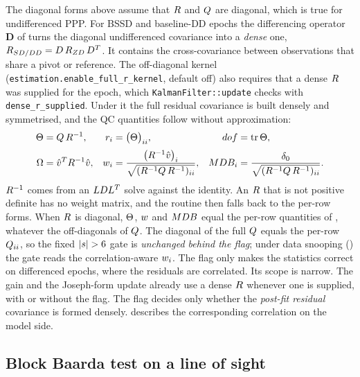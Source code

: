 \documentclass[main.tex]{subfiles}
\begin{document}
The diagonal forms above assume that $R$ and $Q$ are diagonal,
which is true for undifferenced PPP.  For BSSD and baseline-DD epochs
the differencing operator $\bm{D}$ of  turns the diagonal undifferenced covariance into a
\emph{dense} one,
$R_{SD/DD} = D\,R_{ZD}\,D^{T}$.  It
contains the cross-covariance between observations that share a pivot or
reference.  The off-diagonal kernel
(\texttt{estimation.enable\_full\_r\_kernel}, default off) also requires
that a dense $R$ was supplied for the epoch, which
\texttt{KalmanFilter::update} checks with \texttt{dense\_r\_supplied}.
Under it the full residual covariance  is built densely
and symmetrised, and the QC quantities follow without approximation:
\begin{align}
\Theta &= Q\,R^{-1},
  & r_i &= \bigl(\Theta\bigr)_{ii},
  & dof &= \operatorname{tr}\Theta,
\label{eq:qc-full-red}\\[2pt]
\Omega &= \hat{v}^{T}R^{-1}\hat{v},
  & w_i &= \frac{\bigl(R^{-1}\hat{v}\bigr)_i}
                    {\sqrt{(R^{-1}Q\,R^{-1})_{ii}}},
  & MDB_i &= \frac{\delta_0}{\sqrt{(R^{-1}Q\,R^{-1})_{ii}}} .
\label{eq:qc-full-w}
\end{align}
$R^{-1}$ comes from an $LDL^{T}$ solve against the
identity.  An $R$ that is not positive definite has no weight
matrix, and the routine then falls back to the per-row forms.  When
$R$ is diagonal, $\Theta$, $w$ and $MDB$ equal the per-row
quantities of , whatever the off-diagonals of
$Q$.  The diagonal of the full $Q$ equals the per-row
$Q_{ii}$, so the fixed $|s| > 6$ gate is \emph{unchanged behind
the flag}; under data snooping () the gate reads
the correlation-aware $w_i$.  The flag only makes the statistics
correct on differenced epochs, where the residuals are correlated.  Its
scope is narrow.  The gain and the Joseph-form update
already use a dense $R$ whenever one is supplied, with or without
the flag.  The flag decides only whether the \emph{post-fit residual}
covariance is formed densely.  
describes the corresponding correlation on the model side.

\subsection{Block Baarda test on a line of sight}\label{sec:stoch-block}
\end{document}
